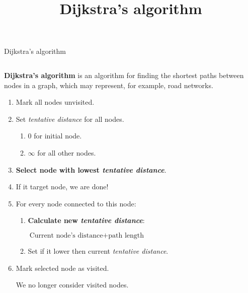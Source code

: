 \documentclass[9pt,aspectratio=169]{beamer}
\title{Dijkstra's algorithm}
\begin{document}
\begin{frame}{Dijkstra's algorithm}
  \begin{columns}[T]
    \begin{column}{0.5\textwidth}
      \textbf{Dijkstra's algorithm} is an algorithm for finding the shortest paths between nodes in a graph, which may represent, for example, road networks. 
      \begin{problem}
        \begin{enumerate}
          \item Mark all nodes unvisited.
          \item Set \emph{tentative distance} for all nodes.
            \begin{enumerate}
              \item $0$ for initial node.
              \item $\infty$ for all other nodes.
            \end{enumerate}
          \item \label{itm:select} \textbf{Select node with lowest \emph{tentative distance}}.
          \item If it target node, we are done!
          \item For every node connected to this node:
            \begin{enumerate}
              \item \textbf{Calculate new \emph{tentative distance}}:

                    \medskip
                    {\large \hspace*{-2em}$\text{Current node's distance} + \text{path length}$}
                    \medskip
              \item Set if it lower then current \emph{tentative distance}.
            \end{enumerate}
          \item Mark selected node as visited.
          
          We no longer consider visited nodes.


\end{enumerate}
\end{problem}
\end{column}
\end{columns}
\end{frame}
\end{document}
